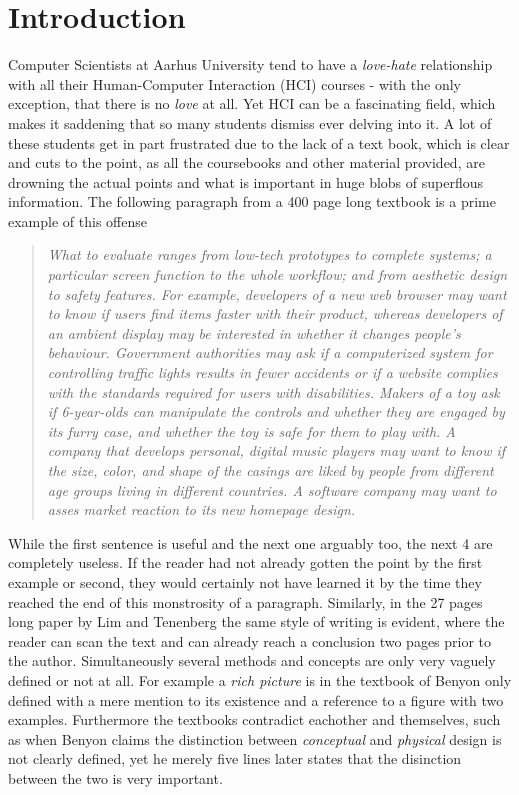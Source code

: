 \chapter{Introduction} \label{chap:introduction}
Computer Scientists at Aarhus University tend to have a \emph{love-hate} relationship with all their Human-Computer Interaction (HCI) courses - with the only exception, that there is no \emph{love} at all. Yet HCI can be a fascinating field, which makes it saddening that so many students dismiss ever delving into it. A lot of these students get in part frustrated due to the lack of a text book, which is clear and cuts to the point, as all the coursebooks and other material provided, are drowning the actual points and what is important in huge blobs of superflous information. The following paragraph from a 400 page long textbook is a prime example of this offense

\blockcquote[p. 435]{rogers}{\it What to evaluate ranges from low-tech prototypes to complete systems; a particular screen function to the whole workflow; and from aesthetic design to safety features. For example, developers of a new web browser may want to know if users find items faster with their product, whereas developers of an ambient display may be interested in whether it changes people's behaviour. Government authorities may ask if a computerized system for controlling traffic lights results in fewer accidents or if a website complies with the standards required for users with disabilities. Makers of a toy ask if 6-year-olds can manipulate the controls and whether they are engaged by its furry case, and whether the toy is safe for them to play with. A company that develops personal, digital music players may want to know if the size, color, and shape of the casings are liked by people from different age groups living in different countries. A software company may want to asses market reaction to its new homepage design.}

\noindent While the first sentence is useful and the next one arguably too, the next 4 are completely useless. If the reader had not already gotten the point by the first example or second, they would certainly not have learned it by the time they reached the end of this monstrosity of a paragraph. Similarly, in the 27 pages long paper by Lim and Tenenberg \cite{lim} the same style of writing is evident, where the reader can scan the text and can already reach a conclusion two pages prior to the author. Simultaneously several methods and concepts are only very vaguely defined or not at all. For example a \emph{rich picture} is in the textbook of Benyon only defined with a mere mention to its existence and a reference to a figure with two examples. \cite[p. 51-52]{benyon14} Furthermore the textbooks contradict eachother and themselves, such as when Benyon claims the distinction between \emph{conceptual} and \emph{physical} design is not clearly defined, yet he merely five lines later states that the disinction between the two is very important. \cite[p. 51]{benyon14}

